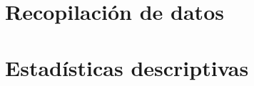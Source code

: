 \documentclass[letterpaper, 12pt]{report}
\begin{document}
\section{Recopilación de datos}


\section{Estadísticas descriptivas}


% 

%

%

%

\begin{doublespace}
  
  
\end{doublespace}
\end{document}
